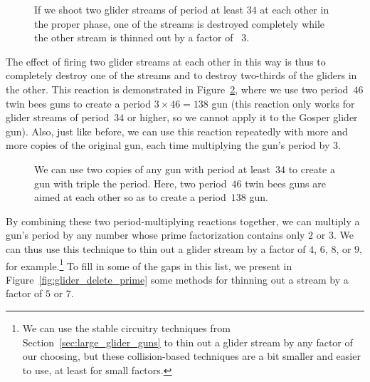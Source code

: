 \begin{figure}[!htb]
	\centering
	\caption{If we shoot two glider streams of period at least $34$ at each other in the proper phase, one of the streams is destroyed completely while the other stream is thinned out by a factor of ~$3$.}\label{fig:glider_delete2}
\end{figure}

The effect of firing two glider streams at each other in this way is thus to completely destroy one of the streams and to destroy two-thirds of the gliders in the other. This reaction is demonstrated in Figure~\ref{fig:p138_gun}, where we use two period~$46$ twin bees guns to create a period $3 \times 46 = 138$ gun (this reaction only works for glider streams of period~$34$ or higher, so we cannot apply it to the Gosper glider gun). Also, just like before, we can use this reaction repeatedly with more and more copies of the original gun, each time multiplying the gun's period by $3$.

\begin{figure}[!htb]
	\centering
	\caption{We can use two copies of any gun with period at least~$34$ to create a gun with triple the period. Here, two period~$46$ twin bees guns are aimed at each other so as to create a period~$138$ gun.}\label{fig:p138_gun}
\end{figure}

By combining these two period-multiplying reactions together, we can multiply a gun's period by any number whose prime factorization contains only $2$ or $3$. We can thus use this technique to thin out a glider stream by a factor of $4$, $6$, $8$, or $9$, for example.\footnote{We can use the stable circuitry techniques from Section~\ref{sec:large_glider_guns} to thin out a glider stream by any factor of our choosing, but these collision-based techniques are a bit smaller and easier to use, at least for small factors.} To fill in some of the gaps in this list, we present in Figure~\ref{fig:glider_delete_prime} some methods for thinning out a stream by a factor of $5$ or $7$.

